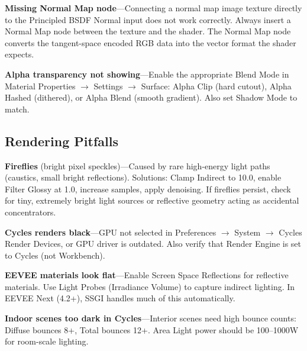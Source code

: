\begin{warningbox}
\textbf{Missing Normal Map node}---Connecting a normal map image
texture directly to the Principled BSDF Normal input does not work
correctly. Always insert a Normal Map node between the texture and
the shader. The Normal Map node converts the tangent-space encoded
RGB data into the vector format the shader expects.
\end{warningbox}

\begin{warningbox}
\textbf{Alpha transparency not showing}---Enable the appropriate
Blend Mode in Material Properties $\rightarrow$ Settings
$\rightarrow$ Surface: Alpha Clip (hard cutout), Alpha Hashed
(dithered), or Alpha Blend (smooth gradient). Also set Shadow Mode
to match.
\end{warningbox}

\subsection{Rendering Pitfalls}

\begin{warningbox}
\textbf{Fireflies} (bright pixel speckles)---Caused by rare
high-energy light paths (caustics, small bright reflections).
Solutions: Clamp Indirect to 10.0, enable Filter Glossy at 1.0,
increase samples, apply denoising. If fireflies persist, check for
tiny, extremely bright light sources or reflective geometry acting
as accidental concentrators.
\end{warningbox}

\begin{warningbox}
\textbf{Cycles renders black}---GPU not selected in Preferences
$\rightarrow$ System $\rightarrow$ Cycles Render Devices, or GPU
driver is outdated. Also verify that Render Engine is set to Cycles
(not Workbench).
\end{warningbox}

\begin{warningbox}
\textbf{EEVEE materials look flat}---Enable Screen Space
Reflections for reflective materials. Use Light Probes (Irradiance
Volume) to capture indirect lighting. In EEVEE Next (4.2+), SSGI
handles much of this automatically.
\end{warningbox}

\begin{warningbox}
\textbf{Indoor scenes too dark in Cycles}---Interior scenes need
high bounce counts: Diffuse bounces 8+, Total bounces 12+. Area
Light power should be 100--1000W for room-scale lighting.
\end{warningbox}

